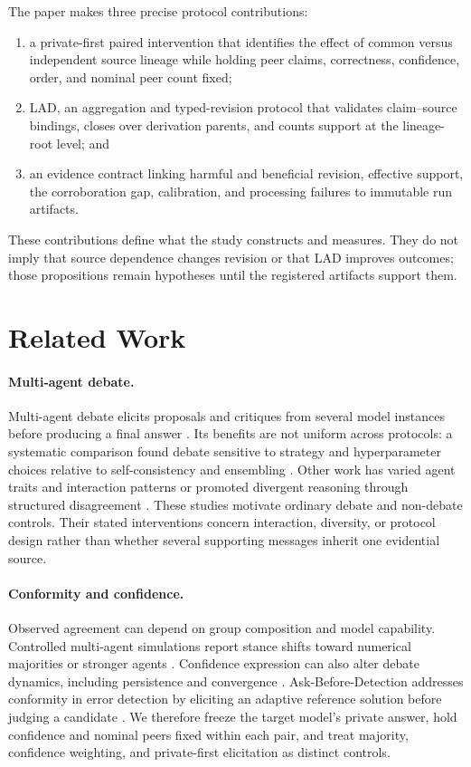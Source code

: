 \documentclass[11pt]{article}
\newcommand{\lad}{\textsc{LAD}}
\begin{document}
The paper makes three precise protocol contributions:
\begin{enumerate}
    \item a private-first paired intervention that identifies the effect of common versus independent source lineage while holding peer claims, correctness, confidence, order, and nominal peer count fixed;
    \item \lad, an aggregation and typed-revision protocol that validates claim--source bindings, closes over derivation parents, and counts support at the lineage-root level; and
    \item an evidence contract linking harmful and beneficial revision, effective support, the corroboration gap, calibration, and processing failures to immutable run artifacts.
\end{enumerate}
These contributions define what the study constructs and measures. They do not imply that source dependence changes revision or that \lad{} improves outcomes; those propositions remain hypotheses until the registered artifacts support them.

\section{Related Work}

\paragraph{Multi-agent debate.}
Multi-agent debate elicits proposals and critiques from several model instances before producing a final answer \citep{pmlr-v235-du24e}. Its benefits are not uniform across protocols: a systematic comparison found debate sensitive to strategy and hyperparameter choices relative to self-consistency and ensembling \citep{pmlr-v235-smit24a}. Other work has varied agent traits and interaction patterns \citep{zhang-etal-2024-exploring} or promoted divergent reasoning through structured disagreement \citep{liang-etal-2024-encouraging}. These studies motivate ordinary debate and non-debate controls. Their stated interventions concern interaction, diversity, or protocol design rather than whether several supporting messages inherit one evidential source.

\paragraph{Conformity and confidence.}
Observed agreement can depend on group composition and model capability. Controlled multi-agent simulations report stance shifts toward numerical majorities or stronger agents \citep{choi-etal-2025-empirical}. Confidence expression can also alter debate dynamics, including persistence and convergence \citep{lin-hooi-2025-enhancing}. Ask-Before-Detection addresses conformity in error detection by eliciting an adaptive reference solution before judging a candidate \citep{li-etal-2025-ask}. We therefore freeze the target model's private answer, hold confidence and nominal peers fixed within each pair, and treat majority, confidence weighting, and private-first elicitation as distinct controls.
\end{document}

